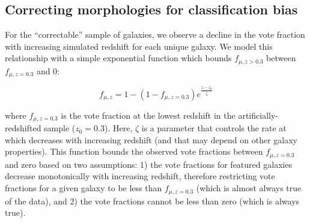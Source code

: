 \documentclass[a4paper,fleqn,usenatbib]{mnras}
\begin{document}
\subsection{Correcting morphologies for classification bias}\label{ssec:zeta}

For the ``correctable'' sample of galaxies, we observe a decline in the vote fraction
\ffeatures{} with increasing simulated redshift for each unique galaxy. 
We model this relationship  with a simple exponential
function which bounds $f_{\mu, z>0.3}$  between $f_{\mu, z=0.3}$ and 0:

\begin{equation}
f_{\mu,z} = 1 - (1 - f_{\mu,z=0.3})e^{\frac{z-z_0}{\hat\zeta}}
\label{eqn:fzeta}
\end{equation}



\noindent where $f_{\mu,z=0.3}$ is the vote fraction at the lowest redshift in
the artificially-redshifted sample ($z_0=0.3$). Here, $\zeta$ is a parameter that
controls the rate at which \ffeatures{} decreases with increasing redshift (and
that may depend on other galaxy properties). This function bounds the observed
vote fractions between $f_{\mu,z=0.3}$ and zero based on two assumptions: 1)
the vote fractions for featured galaxies decrease monotonically with increasing
redshift, therefore restricting vote fractions for a given galaxy to be less
than $f_{\mu,z=0.3}$ (which is almost always true of the data), and 2) the
vote fractions cannot be less than zero (which is always true).
\end{document}
